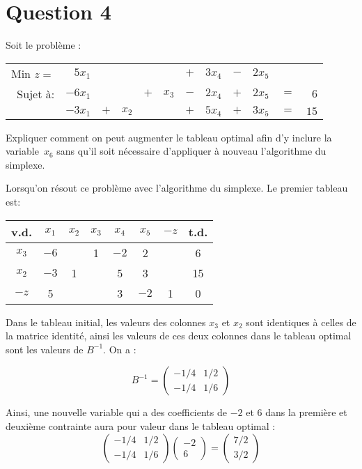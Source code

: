 \section*{Question 4}
\begin{em}
Soit le problème :

\begin{tabular}{@{}rrrrrrrrrrrr@{}}
	Min $z =$ &  $5x_1$ &     &       &     &       & $+$ & $3x_4$ & $-$ & $2x_5$ &     &    \\
	 Sujet à: & $-6x_1$ &     &       & $+$ & $x_3$ & $-$ & $2x_4$ & $+$ & $2x_5$ & $=$ &  $6$ \\
	          & $-3x_1$ & $+$ & $x_2$ &     &       & $+$ & $5x_4$ & $+$ & $3x_5$ & $=$ & $15$
\end{tabular}

Expliquer comment on peut augmenter le tableau optimal afin d’y inclure la variable~$x_6$ sans qu’il soit nécessaire d’appliquer à nouveau l’algorithme du simplexe.
\end{em}

Lorsqu’on résout ce problème avec l’algorithme du simplexe. Le premier tableau est:

\begin{center}
	\renewcommand{\arraystretch}{1.5}
	\begin{tabular}{|c|cccccc|c|}
		\hline
		 v.d.   & $x_{1}$ & $x_{2}$ & $x_{3}$ & $x_{4}$ & $x_{5}$ & $-z$ & t.d. \\ \hline
		$x_{3}$ &  $-6$   &         &    1    &  $-2$   &    2    &      &  6   \\
		$x_{2}$ &  $-3$   &    1    &         &    5    &    3    &      &  15  \\ \hline
		 $-z$   &    5    &         &         &    3    &  $-2$   &  1   &  0   \\ \hline
	\end{tabular}
\end{center}

Dans le tableau initial, les valeurs des colonnes $x_3$ et $x_2$ sont identiques à celles de la matrice identité, ainsi les valeurs de ces deux colonnes dans le tableau optimal sont les valeurs de $B^{-1}$. On a :

\[
B^{-1} = 
\begin{pmatrix}
	-1/4 & 1/2 \\
	-1/4 & 1/6
\end{pmatrix}
\]

Ainsi, une nouvelle variable qui a des coefficients de $-2$ et 6 dans la première et deuxième contrainte aura pour valeur dans le tableau optimal :
\[
\begin{pmatrix}
	-1/4 & 1/2 \\
	-1/4 & 1/6
\end{pmatrix}
\begin{pmatrix}
	-2 \\
	6
\end{pmatrix}
=
\begin{pmatrix}
	7/2 \\
	3/2
\end{pmatrix}
\]

